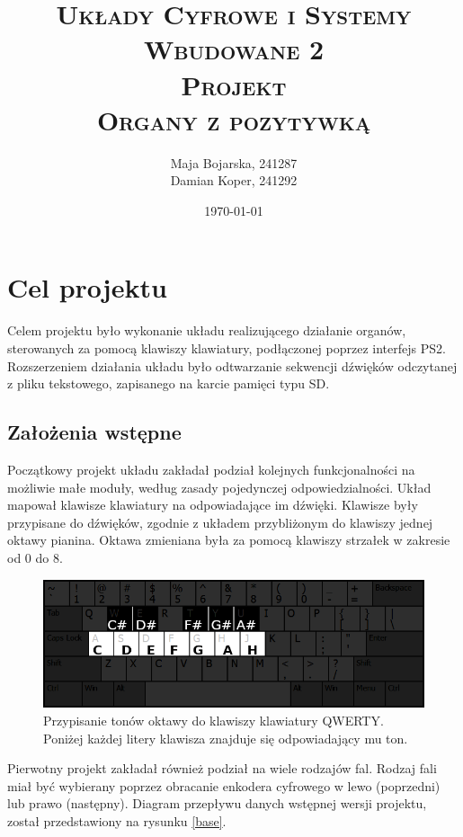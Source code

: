 \documentclass[12pt]{article}
\title{ 
    \vspace*{50mm}
    \textsc{
        \textbf{Układy Cyfrowe i Systemy Wbudowane 2}\\
        \large Projekt \\
         Organy z pozytywką
    }
}
\author{
Maja Bojarska, 241287\\
Damian Koper,  241292\\
}
\date{\today}
\begin{document}
\maketitle

\newpage

\section{Cel projektu}

Celem projektu było wykonanie układu realizującego działanie organów, sterowanych za pomocą klawiszy klawiatury, podłączonej poprzez interfejs PS2. Rozszerzeniem działania układu było odtwarzanie sekwencji dźwięków odczytanej z pliku tekstowego, zapisanego na karcie pamięci typu SD.

\subsection{Założenia wstępne}

Początkowy projekt układu zakładał podział kolejnych funkcjonalności na możliwie małe moduły, według zasady pojedynczej odpowiedzialności. Układ mapował klawisze klawiatury na odpowiadające im dźwięki. Klawisze były przypisane do dźwięków, zgodnie z układem przybliżonym do klawiszy jednej oktawy pianina.  Oktawa zmieniana była za pomocą klawiszy strzałek w zakresie od 0 do 8.

\begin{figure}[h]
  \centering
  \includegraphics[width=\linewidth]{images/key_mapping.png}
  \caption{Przypisanie tonów oktawy do klawiszy klawiatury QWERTY. Poniżej każdej litery klawisza znajduje się odpowiadający mu ton.}
  \label{kay_mapping}
\end{figure}

Pierwotny projekt zakładał również podział na wiele rodzajów fal. Rodzaj fali miał być wybierany poprzez obracanie enkodera cyfrowego w lewo (poprzedni) lub prawo (następny). Diagram przepływu danych wstępnej wersji projektu, został przedstawiony na rysunku \ref{base}.
\end{document}
